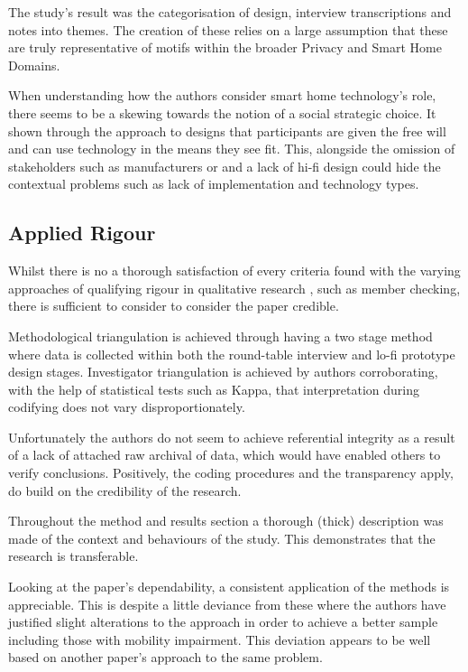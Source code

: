 The study's result was the categorisation of design, interview transcriptions and notes into themes. The creation of these relies on a large assumption that these are truly representative of motifs within the broader Privacy and Smart Home Domains. 

When understanding how the authors consider smart home technology's role, there seems to be a skewing towards the notion of a social strategic choice. It shown through the approach to designs that participants are given the free will and can use technology in the means they see fit. This, alongside the omission of stakeholders such as manufacturers or and a lack of hi-fi design could hide the contextual problems such as lack of implementation and technology types.

\subsection{Applied Rigour}
Whilst there is no a thorough satisfaction of every criteria found with the varying approaches of qualifying rigour in qualitative research , such as member checking, there is sufficient to consider to consider the paper credible.

Methodological triangulation is achieved through having a two stage method where data is collected within both the round-table interview and lo-fi prototype design stages. Investigator triangulation is achieved by authors corroborating, with the help of statistical tests such as Kappa, that interpretation during codifying does not vary disproportionately. 

Unfortunately the authors do not seem to achieve referential integrity as a result of a lack of attached raw archival of data, which would have enabled others to verify conclusions. Positively, the coding procedures and the transparency apply, do build on the credibility of the research.


Throughout the method and results section a thorough (thick) description was made of the context and behaviours of the study. This demonstrates that the research is transferable.


Looking at the paper's dependability, a consistent application of the methods is appreciable. This is despite a little deviance from these where the authors have justified slight alterations to the approach in order to achieve a better sample including those with mobility impairment. This deviation appears to be well based on another paper's approach to the same problem.

